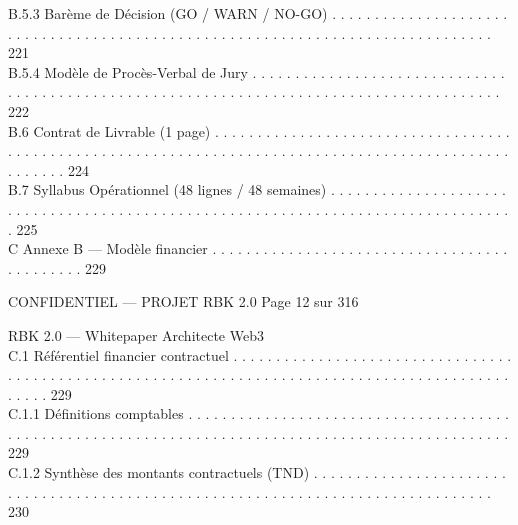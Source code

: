 \documentclass[12pt,landscape,a4paper]{article}
\newenvironment{confidential}
{\begin{tcolorbox}[
    colback=rbkred!5!white,
    colframe=rbkred!75!black,
    title=CONFIDENTIEL,
    fonttitle=\bfseries\color{white},
    coltitle=rbkred!75!black,
    breakable,
    enhanced,
    frame hidden,
    borderline west={2pt}{0pt}{rbkred!75!black}
]}
{\end{tcolorbox}}
\begin{document}
B.5.3              Barème de Décision (GO / WARN / NO-GO) . . . . . . . . . . . . . . . . . . . . . . . . . . . . . . . . . . . . . . . . . . . . . . . . . . . . . . . . . . . . . . . . . . . . . . . . . . . . . . 221\\
B.5.4              Modèle de Procès-Verbal de Jury . . . . . . . . . . . . . . . . . . . . . . . . . . . . . . . . . . . . . . . . . . . . . . . . . . . . . . . . . . . . . . . . . . . . . . . . . . . . . . . . . . . . . . . . 222\\
B.6     Contrat de Livrable (1 page) . . . . . . . . . . . . . . . . . . . . . . . . . . . . . . . . . . . . . . . . . . . . . . . . . . . . . . . . . . . . . . . . . . . . . . . . . . . . . . . . . . . . . . . . . . . . . . . . . . . . . 224\\
B.7     Syllabus Opérationnel (48 lignes / 48 semaines) . . . . . . . . . . . . . . . . . . . . . . . . . . . . . . . . . . . . . . . . . . . . . . . . . . . . . . . . . . . . . . . . . . . . . . . . . . . . . . . . . 225\\
\vspace{0.5em}
C     Annexe B — Modèle financier . . . . . . . . . . . . . . . . . . . . . . . . . . . . . . . . . . . . . . . . . . . . 229\\
\vspace{0.5em}
\vspace{0.5em}
\begin{confidential}CONFIDENTIEL — PROJET RBK 2.0                                                                           Page 12 sur 316\end{confidential}
RBK 2.0 — Whitepaper Architecte Web3\\
\vspace{0.5em}
\vspace{0.5em}
C.1     Référentiel financier contractuel . . . . . . . . . . . . . . . . . . . . . . . . . . . . . . . . . . . . . . . . . . . . . . . . . . . . . . . . . . . . . . . . . . . . . . . . . . . . . . . . . . . . . . . . . . . . . . . . . 229\\
C.1.1               Définitions comptables . . . . . . . . . . . . . . . . . . . . . . . . . . . . . . . . . . . . . . . . . . . . . . . . . . . . . . . . . . . . . . . . . . . . . . . . . . . . . . . . . . . . . . . . . . . . . . . . . 229\\
C.1.2               Synthèse des montants contractuels (TND) . . . . . . . . . . . . . . . . . . . . . . . . . . . . . . . . . . . . . . . . . . . . . . . . . . . . . . . . . . . . . . . . . . . . . . . . . . . . . . . . 230\\
\end{document}

